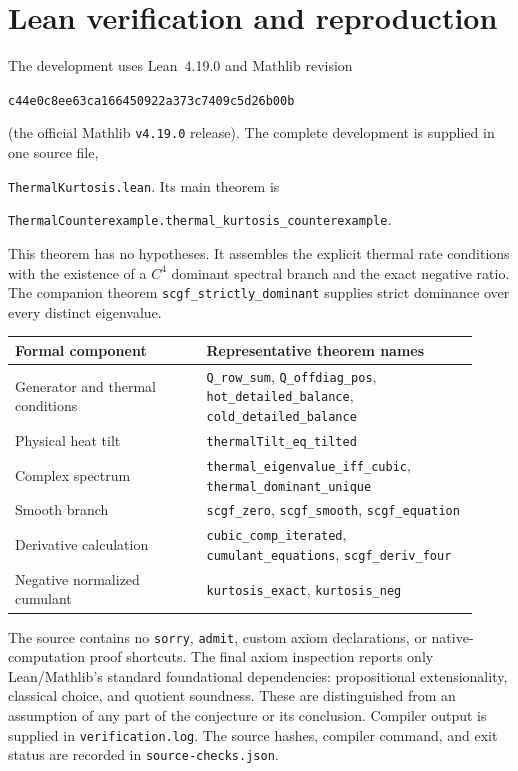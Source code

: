 \documentclass[11pt,a4paper]{article}
\begin{document}
\section{Lean verification and reproduction}
The development uses Lean~4.19.0 and Mathlib revision
\begin{center}
\texttt{c44e0c8ee63ca166450922a373c7409c5d26b00b}
\end{center}
(the official Mathlib \texttt{v4.19.0} release). The complete development is supplied in one source file,\par
\texttt{ThermalKurtosis.lean}. Its main theorem is
\begin{center}
\texttt{ThermalCounterexample.thermal\_kurtosis\_counterexample}.
\end{center}
This theorem has no hypotheses. It assembles the explicit thermal rate conditions with the existence of a $C^4$ dominant spectral branch and the exact negative ratio. The companion theorem \texttt{scgf\_strictly\_dominant} supplies strict dominance over every distinct eigenvalue.

\begin{center}
\begin{tabular}{>{\raggedright\arraybackslash}p{0.38\linewidth}>{\raggedright\arraybackslash}p{0.54\linewidth}}
\toprule
Formal component & Representative theorem names\\
\midrule
Generator and thermal conditions & \texttt{Q\_row\_sum}, \texttt{Q\_offdiag\_pos}, \texttt{hot\_detailed\_balance}, \texttt{cold\_detailed\_balance}\\
Physical heat tilt & \texttt{thermalTilt\_eq\_tilted}\\
Complex spectrum & \texttt{thermal\_eigenvalue\_iff\_cubic}, \texttt{thermal\_dominant\_unique}\\
Smooth branch & \texttt{scgf\_zero}, \texttt{scgf\_smooth}, \texttt{scgf\_equation}\\
Derivative calculation & \texttt{cubic\_comp\_iterated}, \texttt{cumulant\_equations}, \texttt{scgf\_deriv\_four}\\
Negative normalized cumulant & \texttt{kurtosis\_exact}, \texttt{kurtosis\_neg}\\
\bottomrule
\end{tabular}
\end{center}
The source contains no \texttt{sorry}, \texttt{admit}, custom axiom declarations, or native-computation proof shortcuts. The final axiom inspection reports only Lean/Mathlib's standard foundational dependencies: propositional extensionality, classical choice, and quotient soundness. These are distinguished from an assumption of any part of the conjecture or its conclusion. Compiler output is supplied in \texttt{verification.log}. The source hashes, compiler command, and exit status are recorded in \texttt{source-checks.json}.
\end{document}
